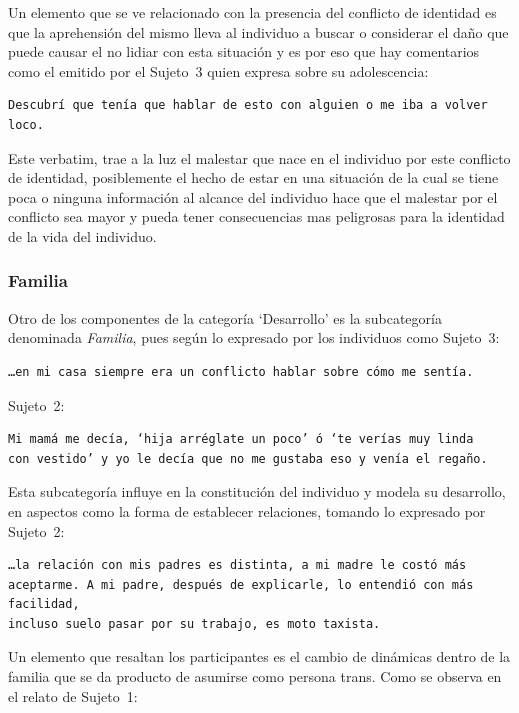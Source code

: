  Un elemento que se ve relacionado con la presencia del conflicto de identidad
 es que la aprehensión del mismo lleva al individuo a buscar o considerar el
 daño que puede causar el no lidiar con esta situación y es por eso que hay
 comentarios como el emitido por el Sujeto~3 quien expresa sobre su
 adolescencia:

 \begin{verbatim}
Descubrí que tenía que hablar de esto con alguien o me iba a volver loco.
 \end{verbatim}

 Este verbatim, trae a la luz el malestar que nace en el individuo por este
 conflicto de identidad, posiblemente el hecho de estar en una situación de la
 cual se tiene poca o ninguna información al alcance del individuo hace que el
 malestar por el conflicto sea mayor y pueda tener consecuencias mas peligrosas
 para la identidad de la vida del individuo.

\subsubsection{Familia}

Otro de los componentes de la categoría ‘Desarrollo’ es la subcategoría
denominada \emph{Familia}, pues según  lo expresado por los individuos como
Sujeto~3:

\begin{verbatim}
…en mi casa siempre era un conflicto hablar sobre cómo me sentía.
\end{verbatim}

Sujeto~2:

\begin{verbatim}
Mi mamá me decía, ‘hija arréglate un poco’ ó ‘te verías muy linda
con vestido’ y yo le decía que no me gustaba eso y venía el regaño.
\end{verbatim}

Esta subcategoría influye en la constitución del individuo y modela su
desarrollo, en aspectos como la forma de establecer relaciones,
tomando lo expresado por Sujeto~2:

\begin{verbatim}
…la relación con mis padres es distinta, a mi madre le costó más
aceptarme. A mi padre, después de explicarle, lo entendió con más facilidad,
incluso suelo pasar por su trabajo, es moto taxista.
\end{verbatim}

Un elemento que resaltan los participantes es el cambio de dinámicas dentro de
la familia que se da producto de asumirse como persona trans. Como se observa en
el relato de Sujeto~1:

